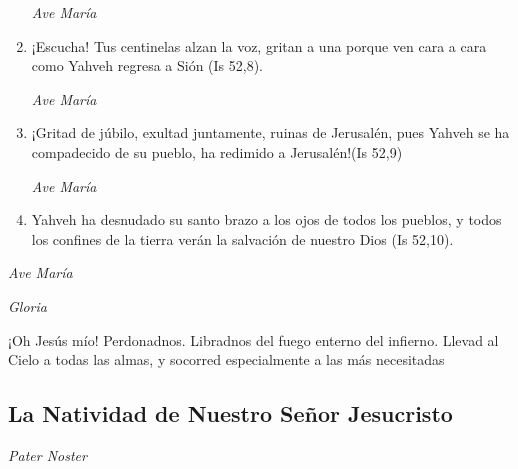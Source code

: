 \documentclass[a4paper,11pt, oneside]{report}
\begin{document}
\begin{enumerate}
          \textit{Ave María}

          \item ¡Escucha! Tus centinelas alzan la voz, gritan a una porque ven cara a cara como Yahveh regresa a Sión (Is 52,8).
          
          \textit{Ave María}

          \item ¡Gritad de júbilo, exultad juntamente, ruinas de Jerusalén, pues Yahveh se ha compadecido de su pueblo, ha redimido a Jerusalén!(Is 52,9)
          
          \textit{Ave María}

          \item Yahveh ha desnudado su santo brazo a los ojos de todos los pueblos, y todos los confines de la tierra verán la salvación de nuestro Dios (Is 52,10).

        \end{enumerate}

        \textit{Ave María} \par
        \indent\textit{Gloria} \par
        \indent¡Oh Jesús mío! Perdonadnos. Libradnos del fuego enterno del infierno. Llevad al Cielo a todas las almas, y socorred especialmente a las más 
        necesitadas
            
      \subsection*{La Natividad de Nuestro Señor Jesucristo}
      
        \textit{Pater Noster} 
\end{document}
